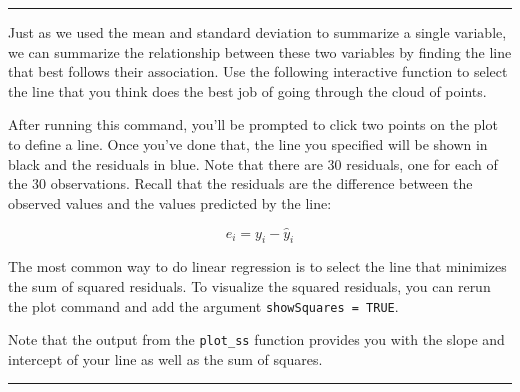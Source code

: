 \documentclass[]{book}
\newenvironment{Shaded}{\begin{snugshade}}{\end{snugshade}}
\newcommand{\KeywordTok}[1]{\textcolor[rgb]{0.13,0.29,0.53}{\textbf{#1}}}
\newcommand{\DataTypeTok}[1]{\textcolor[rgb]{0.13,0.29,0.53}{#1}}
\newcommand{\OtherTok}[1]{\textcolor[rgb]{0.56,0.35,0.01}{#1}}
\newcommand{\OperatorTok}[1]{\textcolor[rgb]{0.81,0.36,0.00}{\textbf{#1}}}
\newcommand{\NormalTok}[1]{#1}
\theoremstyle{definition}
\theoremstyle{definition}
\theoremstyle{definition}
\theoremstyle{remark}
\begin{document}
\begin{center}\rule{0.5\linewidth}{\linethickness}\end{center}

Just as we used the mean and standard deviation to summarize a single
variable, we can summarize the relationship between these two variables
by finding the line that best follows their association. Use the
following interactive function to select the line that you think does
the best job of going through the cloud of points.

\begin{Shaded}
\end{Shaded}

After running this command, you'll be prompted to click two points on
the plot to define a line. Once you've done that, the line you specified
will be shown in black and the residuals in blue. Note that there are 30
residuals, one for each of the 30 observations. Recall that the
residuals are the difference between the observed values and the values
predicted by the line:

\[
  e_i = y_i - \hat{y}_i
\]

The most common way to do linear regression is to select the line that
minimizes the sum of squared residuals. To visualize the squared
residuals, you can rerun the plot command and add the argument
\texttt{showSquares\ =\ TRUE}.

\begin{Shaded}
\end{Shaded}

Note that the output from the \texttt{plot\_ss} function provides you
with the slope and intercept of your line as well as the sum of squares.

\begin{center}\rule{0.5\linewidth}{\linethickness}\end{center}
\end{document}
